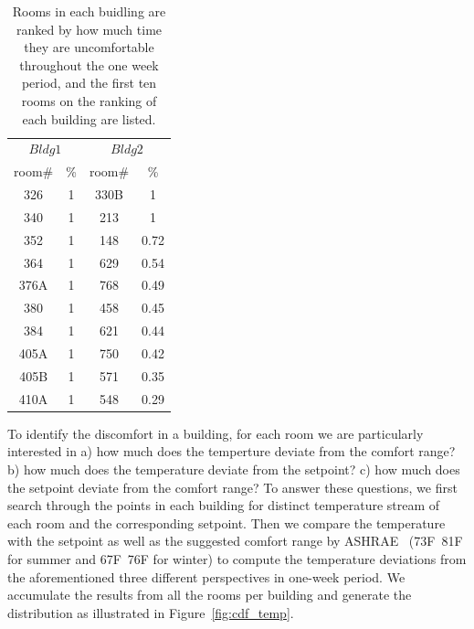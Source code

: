 \begin{table}[h!]
 \begin{center}
	\begin{tabular}{|c|c|c|c|}
	\multicolumn{2}{c}{$Bldg 1$}
	 & \multicolumn{2}{c}{$Bldg 2$}\\
	\cline{1-4} 
	 room\# & \% & room\# & \%\\
	\cline{1-4}
	 326 & 1 & 330B & 1\\
	\cline{1-4}
	 340 & 1 & 213 & 1\\
	\cline{1-4}
	352 & 1 & 148 & 0.72\\
	\cline{1-4}
	364 & 1 & 629 & 0.54\\
	\cline{1-4}
	376A & 1 & 768 & 0.49\\
	\cline{1-4}
	380 & 1 & 458 & 0.45\\
	\cline{1-4}
	384 & 1 & 621 & 0.44\\
	\cline{1-4}
	405A & 1 & 750 & 0.42\\
	\cline{1-4}
	405B & 1 & 571 & 0.35\\
	\cline{1-4}
	410A & 1 & 548 & 0.29\\
	\cline{1-4}
	\end{tabular}
 \end{center}
 \caption{Rooms in each buidling are ranked by how much time they are uncomfortable throughout the one week period, and the first ten rooms on the ranking of each building are listed.}
 \label{tab:uncmft}
\end{table}

To identify the discomfort in a building, for each room we are particularly interested in a) how much does the temperture deviate from the comfort range? b) how much does the temperature deviate from the setpoint? c) how much does the setpoint deviate from the comfort range? To answer these questions, we first search through the points in each building for distinct temperature stream of each room and the corresponding setpoint. Then we compare the temperature with the setpoint as well as the suggested comfort range by ASHRAE~\cite{} (73F~81F for summer and 67F~76F for winter) to compute the temperature deviations from the aforementioned three different perspectives in one-week period. We accumulate the results from all the rooms per building and generate the distribution as illustrated in Figure~\ref{fig:cdf_temp}.

